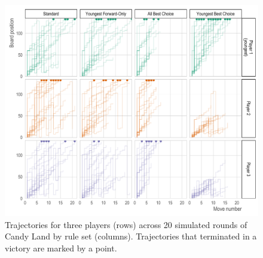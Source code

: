 \documentclass[letterpaper,9pt,twocolumn,twoside,]{pinp}
\begin{document}
\begin{figure}
  \begin{center}
    \includegraphics[width=5in]{./../../plots/p_trajectories.pdf}
    \caption{Trajectories for three players (rows) across 20 simulated rounds of Candy Land by rule set (columns). Trajectories that terminated in a victory are marked by a point.}
    \label{fig:p_trajectories}
  \end{center}
\end{figure}

\end{document}
